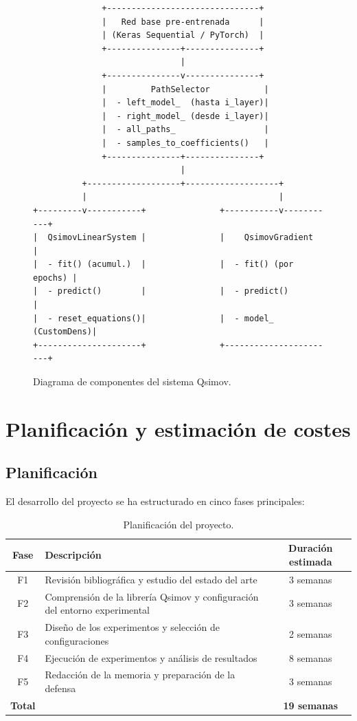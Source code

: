 \begin{figure}[htbp]
  \centering
\begin{verbatim}
              +-------------------------------+
              |   Red base pre-entrenada      |
              | (Keras Sequential / PyTorch)  |
              +---------------+---------------+
                              |
              +---------------v---------------+
              |         PathSelector           |
              |  - left_model_  (hasta i_layer)|
              |  - right_model_ (desde i_layer)|
              |  - all_paths_                  |
              |  - samples_to_coefficients()   |
              +---------------+---------------+
                              |
          +-------------------+-------------------+
          |                                       |
+---------v-----------+               +-----------v-----------+
|  QsimovLinearSystem |               |    QsimovGradient     |
|  - fit() (acumul.)  |               |  - fit() (por epochs) |
|  - predict()        |               |  - predict()          |
|  - reset_equations()|               |  - model_ (CustomDens)|
+---------------------+               +-----------------------+
\end{verbatim}
  \caption{Diagrama de componentes del sistema Qsimov.}
  \label{fig:componentes}
\end{figure}

\section{Planificación y estimación de costes}

\subsection{Planificación}

El desarrollo del proyecto se ha estructurado en cinco fases principales:

\begin{table}[htbp]
  \centering
  \caption{Planificación del proyecto.}
  \label{tab:planificacion}
  \begin{tabular}{cp{8.5cm}c}
    \toprule
    \textbf{Fase} & \textbf{Descripción} & \textbf{Duración estimada} \\
    \midrule
    F1 & Revisión bibliográfica y estudio del estado del arte                       & 3 semanas \\
    F2 & Comprensión de la librería Qsimov y configuración del entorno experimental & 3 semanas \\
    F3 & Diseño de los experimentos y selección de configuraciones                  & 2 semanas \\
    F4 & Ejecución de experimentos y análisis de resultados                         & 8 semanas \\
    F5 & Redacción de la memoria y preparación de la defensa                        & 3 semanas \\
    \midrule
    \textbf{Total} & & \textbf{19 semanas} \\
    \bottomrule
  \end{tabular}
\end{table}

